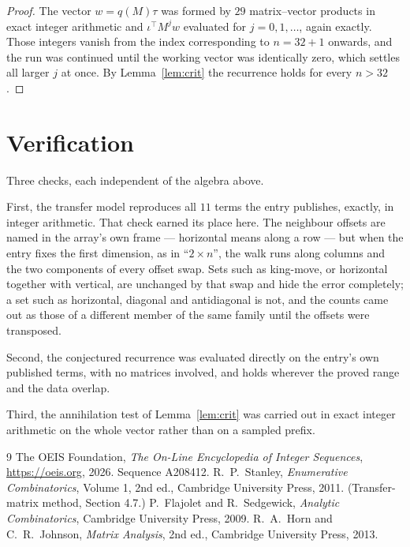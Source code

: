 \documentclass[11pt,a4paper]{article}
\theoremstyle{plain}
\theoremstyle{definition}
\begin{document}
\begin{proof}
The vector $w=q(M)\tau$ was formed by $29$ matrix--vector products in exact integer
arithmetic and $\iota^{\!\top}M^{j}w$ evaluated for $j=0,1,\dots$, again exactly. Those
integers vanish from the index corresponding to $n=32+1$ onwards, and the run was
continued until the working vector was identically zero, which settles all larger $j$ at once.
By Lemma~\ref{lem:crit} the recurrence holds for every $n>32$.
\end{proof}

\section{Verification}

Three checks, each independent of the algebra above.

First, the transfer model reproduces all $11$ terms the entry publishes, exactly, in
integer arithmetic. That check earned its place here. The neighbour offsets are named in the
array's own frame --- horizontal means along a row --- but when the entry fixes the first
dimension, as in ``$2\times n$'', the walk runs along columns and the two components of every
offset swap. Sets such as king-move, or horizontal together with vertical, are unchanged by
that swap and hide the error completely; a set such as horizontal, diagonal and antidiagonal
is not, and the counts came out as those of a different member of the same family until the
offsets were transposed.

Second, the conjectured recurrence was evaluated directly on the entry's own published terms,
with no matrices involved, and holds wherever the proved range and the data overlap.

Third, the annihilation test of Lemma~\ref{lem:crit} was carried out in exact integer
arithmetic on the whole vector rather than on a sampled prefix.

\begin{thebibliography}{9}
 The OEIS Foundation, \emph{The On-Line Encyclopedia of Integer
Sequences}, \url{https://oeis.org}, 2026. Sequence A208412.
 R.~P.~Stanley, \emph{Enumerative Combinatorics}, Volume 1, 2nd ed.,
Cambridge University Press, 2011. (Transfer-matrix method, Section 4.7.)
 P.~Flajolet and R.~Sedgewick, \emph{Analytic Combinatorics}, Cambridge
University Press, 2009.
 R.~A.~Horn and C.~R.~Johnson, \emph{Matrix Analysis}, 2nd ed., Cambridge
University Press, 2013.
\end{thebibliography}
\end{document}

